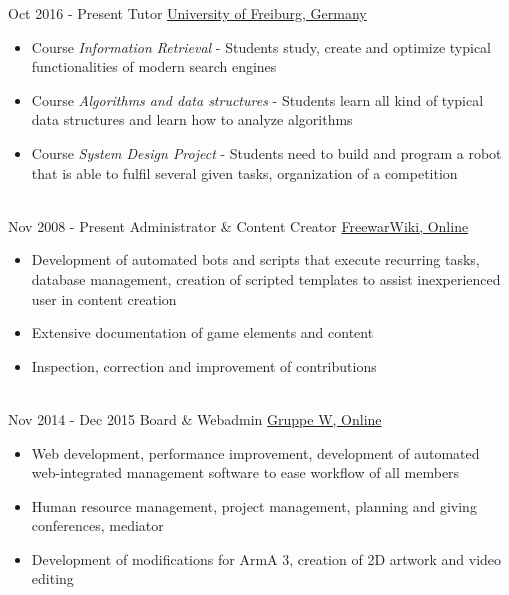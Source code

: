 \documentclass[letterpaper]{twentysecondcv} %
\begin{document}
\begin{twenty} %
     	\twentyitem
    		{Oct 2016 -}
		{Present}
        		{Tutor}
        		{\href{https://www.uni-freiburg.de/}{University of Freiburg, Germany}}
        		{}
        		{\begin{itemize}
        			\item Course \textit{Information Retrieval} - Students study, create and optimize typical
        				functionalities of modern search engines
        			\item Course \textit{Algorithms and data structures} - Students learn all kind of typical data
        				structures and learn how to analyze algorithms
        			\item Course \textit{System Design Project} - Students need to build and program a robot that is
        				able to fulfil several given tasks, organization of a competition
        		\end{itemize}}\\
     	\twentyitem
    		{Nov 2008 -}
		{Present}
        		{Administrator \& Content Creator}
        		{\href{http://www.fwwiki.de/}{FreewarWiki, Online}}
        		{}
        		{\begin{itemize}
        			\item Development of automated bots and scripts that execute recurring tasks, database management,
        				creation of scripted templates to assist inexperienced user in content creation
        			\item Extensive documentation of game elements and content
        			\item Inspection, correction and improvement of contributions
        		\end{itemize}}\\
	\twentyitem
    		{Nov 2014 -}
		{Dec 2015}
        		{Board \& Webadmin}
        		{\href{https://www.gruppe-w.de/}{Gruppe W, Online}}
        		{}
        		{\begin{itemize}
        			\item Web development, performance improvement, development of automated web-integrated
        				management software to ease workflow of all members
			\item Human resource management, project management, planning and giving conferences, mediator
        			\item Development of modifications for ArmA 3, creation of 2D artwork and video editing
        		\end{itemize}}\\

\end{twenty}
\end{document}
